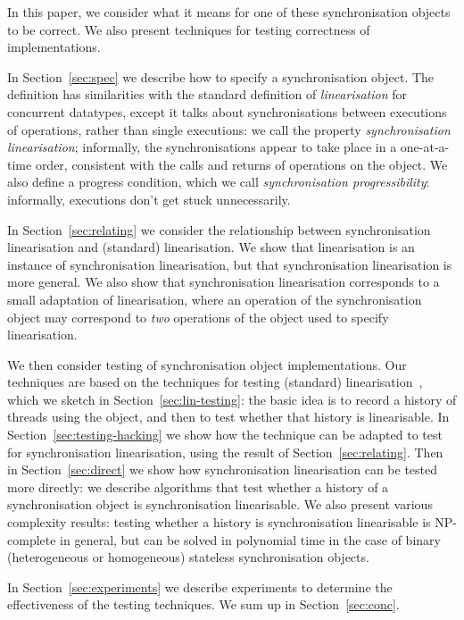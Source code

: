 
In this paper, we consider what it means for one of these synchronisation
objects to be correct.  We also present techniques for testing correctness of
implementations.

In Section~\ref{sec:spec} we describe how to specify a synchronisation object.
The definition has similarities with the standard definition of
\emph{linearisation} for concurrent datatypes, except it talks about
synchronisations between executions of operations, rather than single
executions: we call the property \emph{synchronisation linearisation};
informally, the synchronisations appear to take place in a one-at-a-time
order, consistent with the calls and returns of operations on the object.  We
also define a progress condition, which we call \emph{synchronisation
  progressibility}: informally, executions don't get stuck unnecessarily.

In Section~\ref{sec:relating} we consider the relationship between
synchronisation linearisation and (standard) linearisation.  We show that
linearisation is an instance of synchronisation linearisation, but that
synchronisation linearisation is more general.  We also show that
synchronisation linearisation corresponds to a small adaptation of
linearisation, where an operation of the synchronisation object may correspond
to \emph{two} operations of the object used to specify linearisation.

We then consider testing of synchronisation object implementations.  Our
techniques are based on the techniques for testing (standard)
linearisation~\cite{gavin:lin-testing}, which we sketch in
Section~\ref{sec:lin-testing}: the basic idea is to record a history of
threads using the object, and then to test whether that history is
linearisable.
%
In Section~\ref{sec:testing-hacking} we show how the technique can be adapted
to test for synchronisation linearisation, using the result of
Section~\ref{sec:relating}.  Then in Section~\ref{sec:direct} we show how
synchronisation linearisation can be tested more directly: we describe
algorithms that test whether a history of a synchronisation object is
synchronisation linearisable.  We also present various
complexity results: testing whether a history is synchronisation linearisable
is NP-complete in general, but can be solved in polynomial time in the case of
binary (heterogeneous or homogeneous) stateless synchronisation objects.


In Section~\ref{sec:experiments} we describe experiments to determine the
effectiveness of the testing techniques.  We sum up in
Section~\ref{sec:conc}. 

